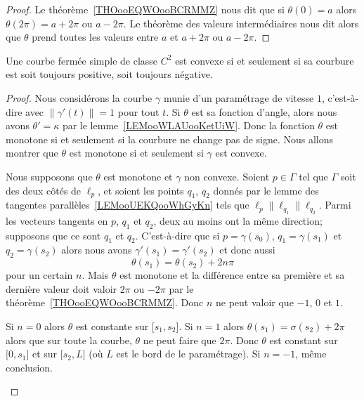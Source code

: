 \begin{proof}
	Le théorème~\ref{THOooEQWOooBCRMMZ} nous dit que si \( \theta(0)=a\) alors \( \theta(2\pi)=a+2\pi\) ou \( a-2\pi\). Le théorème des valeurs intermédiaires nous dit alors que \( \theta\) prend toutes les valeurs entre \( a\) et \( a+2\pi\) ou \( a-2\pi\).
\end{proof}

\begin{proposition}      \label{PROPooWXUKooPOtPdj}
	Une courbe fermée simple de classe \(  C^{2}\) est convexe si et seulement si sa courbure est soit toujours positive, soit toujours négative.
\end{proposition}

\begin{proof}
	Nous considérons la courbe \( \gamma\) munie d'un paramétrage de vitesse \( 1\), c'est-à-dire avec \( \| \gamma'(t) \|=1\) pour tout \( t\). Si \( \theta\) est sa fonction d'angle, alors nous avons \( \theta'=\kappa\) par le lemme~\ref{LEMooWLAUooKetUiW}. Donc la fonction \( \theta\) est monotone si et seulement si la courbure ne change pas de signe. Nous allons montrer que \( \theta\) est monotone si et seulement si \( \gamma\) est convexe.

	\begin{subproof}
		\spitem[\( \Rightarrow\)]

		Nous supposons que \( \theta\) est monotone et \( \gamma\) non convexe. Soient \( p\in \Gamma\) tel que \( \Gamma\) soit des deux côtés de \( \ell_p\), et soient les points \( q_1\), \( q_2\) donnés par le lemme des tangentes parallèles~\ref{LEMooUEKQooWhGyKn} tels que \( \ell_p\parallel\ell_{q_1}\parallel\ell_{q_2}\). Parmi les vecteurs tangents en \( p\), \( q_1\) et \( q_2\), deux au moins ont la même direction; supposons que ce sont \( q_1\) et \( q_2\). C'est-à-dire que si \( p=\gamma(s_0)\), \( q_1=\gamma(s_1)\) et \( q_2=\gamma(s_2)\) alors nous avons \( \gamma'(s_1)=\gamma'(s_2)\) et donc aussi
		\begin{equation}
			\theta(s_1)=\theta(s_2)+2n\pi
		\end{equation}
		pour un certain \( n\). Mais \( \theta\) est monotone et la différence entre sa première et sa dernière valeur doit valoir \( 2\pi\) ou \( -2\pi\) par le théorème~\ref{THOooEQWOooBCRMMZ}. Donc \( n\) ne peut valoir que \( -1\), \( 0\) et \( 1\).

		Si \( n=0\) alors \( \theta\) est constante sur \( \mathopen[ s_1 , s_2 \mathclose]\). Si \( n=1\) alors \( \theta(s_1)=\sigma(s_2)+2\pi\) alors que sur toute la courbe, \( \theta\) ne peut faire que \( 2\pi\). Donc \( \theta\) est constant sur \( \mathopen[ 0 , s_1 \mathclose]\) et sur \( \mathopen[ s_2 , L \mathclose]\) (où \( L\) est le bord de le paramétrage). Si \( n=-1\), même conclusion.


\end{subproof}
\end{proof}
